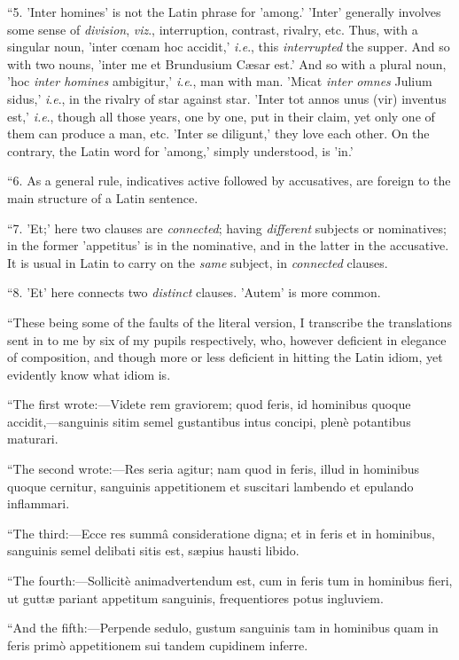 ``5. 'Inter homines' is not the Latin phrase for 'among.'
'Inter' generally involves some sense of \emph{division}, \emph{viz}.,
interruption, contrast, rivalry, etc. Thus, with a singular noun,
'inter cœnam hoc accidit,' \emph{i.e}., this \emph{interrupted} the
supper. And so with two nouns, 'inter me et Brundusium Cæsar est.'
And so with a plural noun, 'hoc \emph{inter homines} ambigitur,' \emph{i}.\emph{e}.,
man with man. 'Micat \emph{inter omnes} Julium sidus,' \emph{i}.\emph{e}.,
in the rivalry of star against star. 'Inter tot annos unus (vir)
inventus est,' \emph{i.e}., though all those years, one by one, put in their
claim, yet only one of them can produce a man, etc. 'Inter se diligunt,'
they love each other. On the contrary, the Latin word for 'among,'
simply understood, is 'in.'

``6. As a general rule, indicatives active followed by
accusatives, are foreign to the main structure of a Latin sentence.

``7. 'Et;' here two clauses are \emph{connected}; having \emph{different}
subjects or nominatives; in the former 'appetitus' is in the
nominative, and in the latter in the accusative. It is usual in Latin
to carry on the \emph{same} subject, in \emph{connected} clauses.

``8. 'Et' here connects two \emph{distinct} clauses. 'Autem' is
more common.

``These being some of the faults of the literal version, I
transcribe the translations sent in to me by six of my pupils
respectively, who, however deficient in elegance of composition, and
though more or less deficient in hitting the Latin idiom, yet
evidently know what idiom is.

``The first wrote:—Videte rem graviorem; quod feris, id
hominibus quoque accidit,—sanguinis sitim semel gustantibus intus
concipi, plenè potantibus maturari.

``The second wrote:—Res seria agitur; nam quod in feris,
illud in hominibus quoque cernitur, sanguinis appetitionem et
suscitari lambendo et epulando inflammari.

``The third:—Ecce res summâ consideratione digna; et in
feris et in hominibus, sanguinis semel delibati sitis est, sæpius
hausti libido.

``The fourth:—Sollicitè animadvertendum est, cum in feris
tum in hominibus fieri, ut guttæ pariant appetitum sanguinis,
frequentiores potus ingluviem.

``And the fifth:—Perpende sedulo, gustum sanguinis tam in
hominibus quam in feris primò appetitionem sui tandem cupidinem
inferre.

